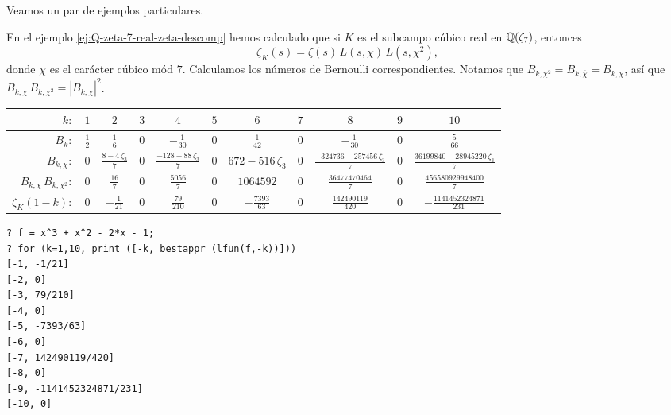 Veamos un par de ejemplos particulares.

\begin{ejemplo}
  En el ejemplo \ref{ej:Q-zeta-7-real-zeta-descomp} hemos calculado que si $K$
  es el subcampo cúbico real en $\mathbb{Q} (\zeta_7)$, entonces
  $$\zeta_K (s) = \zeta (s) \, L (s,\chi) \, L (s,\chi^2),$$
  donde $\chi$ es el carácter cúbico mód $7$. Calculamos los números de
  Bernoulli correspondientes. Notamos que
  $B_{k,\chi^2} = B_{k,\overline{\chi}} = \overline{B_{k,\chi}}$, así que
  $B_{k,\chi}\,B_{k,\chi^2} = |B_{k,\chi}|^2$.

  \begin{center}
    \renewcommand{\arraystretch}{1.5}
    \begin{tabular}{rcccccccccc}
      \hline
      $k\colon$ & $1$ & $2$ & $3$ & $4$ & $5$ & $6$ & $7$ & $8$ & $9$ & $10$ \\
      \hline
      $B_k\colon$ & $\frac{1}{2}$ & $\frac{1}{6}$ & $0$ & $-\frac{1}{30}$ & $0$ & $\frac{1}{42}$ & $0$ & $-\frac{1}{30}$ & $0$ & $\frac{5}{66}$ \\
      \hline
      $B_{k,\chi}\colon$ & $0$ & $\frac{8-4\,\zeta_3}{7}$ & $0$ & $\frac{-128 + 88\,\zeta_3}{7}$ & $0$ & $672 - 516\,\zeta_3$ & $0$ & $\frac{-324736 + 257456\,\zeta_3}{7}$ & $0$ & $\frac{36199840 - 28945220\,\zeta_3}{7}$ \\
      \hline
      $B_{k,\chi}\,B_{k,\chi^2}\colon$ & $0$ & $\frac{16}{7}$ & $0$ & $\frac{5056}{7}$ & $0$ & $1064592$ & $0$ & $\frac{36477470464}{7}$ & $0$ & $\frac{456580929948400}{7}$ \\
      \hline
      $\zeta_K (1-k)\colon$ & $0$ & $-\frac{1}{21}$ & $0$ & $\frac{79}{210}$ & $0$ & $-\frac{7393}{63}$ & $0$ & $\frac{142490119}{420}$ & $0$ & $-\frac{1141452324871}{231}$ \\
      \hline
    \end{tabular}
  \end{center}

  \begin{shaded}
\begin{verbatim}
? f = x^3 + x^2 - 2*x - 1;
? for (k=1,10, print ([-k, bestappr (lfun(f,-k))]))
[-1, -1/21]
[-2, 0]
[-3, 79/210]
[-4, 0]
[-5, -7393/63]
[-6, 0]
[-7, 142490119/420]
[-8, 0]
[-9, -1141452324871/231]
[-10, 0]
\end{verbatim}
\end{shaded}
\end{ejemplo}

